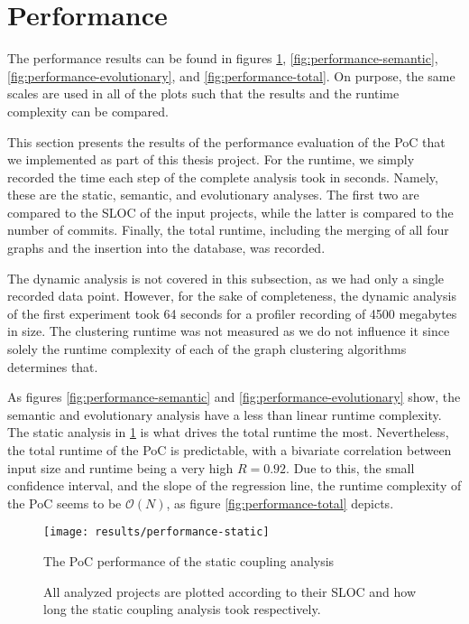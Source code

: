 \documentclass[12pt,a4paper]{report}
\begin{document}
\section{Performance}

The performance results can be found in figures \ref{fig:performance-static},
\ref{fig:performance-semantic}, \ref{fig:performance-evolutionary}, and
\ref{fig:performance-total}. On purpose, the same scales are used in all of the
plots such that the results and the runtime complexity can be compared.

This section presents the results of the performance evaluation of the PoC that
we implemented as part of this thesis project. For the runtime, we simply
recorded the time each step of the complete analysis took in seconds. Namely,
these are the static, semantic, and evolutionary analyses. The first two are
compared to the SLOC of the input projects, while the latter is compared to the
number of commits. Finally, the total runtime, including the merging of all
four graphs and the insertion into the database, was recorded.

The dynamic analysis is not covered in this subsection, as we had only a single
recorded data point. However, for the sake of completeness, the dynamic
analysis of the first experiment took 64 seconds for a profiler recording of
4500 megabytes in size. The clustering runtime was not measured as we do not
influence it since solely the runtime complexity of each of the graph
clustering algorithms determines that.

As figures \ref{fig:performance-semantic} and \ref{fig:performance-evolutionary}
show, the semantic and evolutionary analysis have a less than
linear runtime complexity. The static analysis in \ref{fig:performance-static}
is what drives the total runtime the most. Nevertheless, the total runtime of
the PoC is predictable, with a bivariate correlation between input size and
runtime being a very high \(R = 0.92\). Due to this, the small confidence
interval, and the slope of the regression line, the runtime complexity of the
PoC seems to be \(\mathcal{O}(N)\), as figure \ref{fig:performance-total}
depicts.

\begin{figure}[htbp]
\centering
\texttt{[image: results/performance-static]}
\caption{The PoC performance of the static coupling analysis}
\caption*{\centering
  All analyzed projects are plotted according to their SLOC
  and how long the static coupling analysis took respectively.
}
\label{fig:performance-static}
\end{figure}
\end{document}
